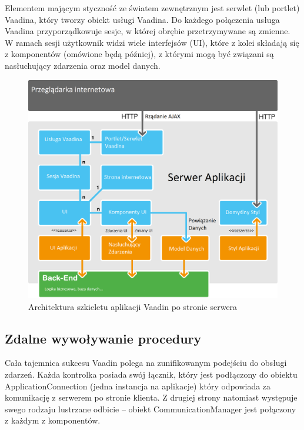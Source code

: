 Elementem mającym styczność ze światem zewnętrznym jest serwlet (lub portlet) Vaadina, który tworzy obiekt usługi Vaadina. Do każdego połączenia usługa Vaadina przyporządkowuje sesje, w której obrębie przetrzymywane są zmienne. W ramach sesji użytkownik widzi wiele interfejsów (UI), które z kolei składają się z komponentów (omówione będą później), z którymi mogą być związani są nasłuchujący zdarzenia oraz model danych. 

\begin{figure} [H]
    \begin{center}
	\includegraphics[scale=.3]{img/serverSide.png}
	\caption{Architektura szkieletu aplikacji Vaadin po stronie serwera}
	\label{serverVaadin}
    \end{center}
\end{figure}

\subsection{Zdalne wywoływanie procedury}
Cała tajemnica sukcesu Vaadin polega na zunifikowanym podejściu do obsługi zdarzeń. Każda kontrolka posiada swój łącznik, który jest podłączony do obiektu ApplicationConnection (jedna instancja na aplikacje) który odpowiada za komunikację z serwerem po stronie klienta. Z drugiej strony natomiast występuje swego
rodzaju lustrzane odbicie – obiekt CommunicationManager jest połączony z każdym z komponentów. 

